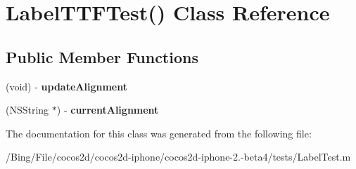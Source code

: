 \hypertarget{interface_label_t_t_f_test_07_08}{\section{Label\-T\-T\-F\-Test() Class Reference}
\label{interface_label_t_t_f_test_07_08}
}
\subsection*{Public Member Functions}
\begin{DoxyCompactItemize}
\item 
\hypertarget{interface_label_t_t_f_test_07_08_a1e15b2e391cc72ae422054cd23981e5c}{(void) -\/ {\bfseries update\-Alignment}}\label{interface_label_t_t_f_test_07_08_a1e15b2e391cc72ae422054cd23981e5c}

\item 
\hypertarget{interface_label_t_t_f_test_07_08_a97cbbcca49317ee38b704a31b8b1ae12}{(N\-S\-String $\ast$) -\/ {\bfseries current\-Alignment}}\label{interface_label_t_t_f_test_07_08_a97cbbcca49317ee38b704a31b8b1ae12}

\end{DoxyCompactItemize}


The documentation for this class was generated from the following file\-:\begin{DoxyCompactItemize}
\item 
/\-Bing/\-File/cocos2d/cocos2d-\/iphone/cocos2d-\/iphone-\/2.-\/beta4/tests/Label\-Test.\-m\end{DoxyCompactItemize}
